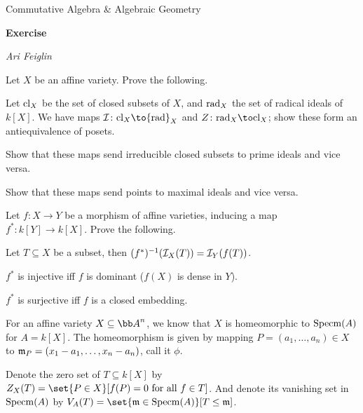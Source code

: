 


\def\enumindent{0cm}

\def\printmcount{\the\counter{section}.\the\counter{math counter}}
\setcounter{section}{7}

\centerline{Commutative Algebra \& Algebraic Geometry}
\medskip
\centerline{\bf Exercise \the{}}
\smallskip
\centerline{\it Ari Feiglin}

\def\rad{{\rm rad}}

\bprob

    \benum
        \item Let $X$ be an affine variety.
        Prove the following.
        \benum
            \item Let ${\rm cl}_X$ be the set of closed subsets of $X$, and $\rad_X$ the set of radical ideals of $k[X]$.
            We have maps $\I\colon\cll_X\to\rad_X$ and $Z\colon\rad_X\to\cll_X$; show these form an antiequivalence of posets.

            \item Show that these maps send irreducible closed subsets to prime ideals and vice versa.

            \item Show that these maps send points to maximal ideals and vice versa.
        \eenum

        \item Let $f\colon X\to Y$ be a morphism of affine varieties, inducing a map $f^*\colon k[Y]\to k[X]$.
        Prove the following.
        \benum
            \item Let $T\subseteq X$ be a subset, then $(f^*)^{-1}({{\cal I}}_X(T))={{\cal I}}_Y(f(T))$.
            \item $f^*$ is injective iff $f$ is {\emphcolor dominant} ($f(X)$ is dense in $Y$).
            \item $f^*$ is surjective iff $f$ is a closed embedding.
        \eenum
    \eenum

\eprob

\def\prime{{\rm prime}}

\benum
    \item For an affine variety $X\subseteq\bA^n$, we know that $X$ is homeomorphic to ${\rm Specm}(A)$ for $A=k[X]$.
    The homeomorphism is given by mapping $P=(a_1,\dots,a_n)\in X$ to ${{\frak m}}_P=(x_1-a_1,\dots,x_n-a_n)$, call it $\phi$.

    Denote the zero set of $T\subseteq k[X]$ by $Z_X(T)=\set{P\in X}[f(P)=0\hbox{ for all $f\in T$}]$.
    And denote its vanishing set in ${\rm Specm}(A)$ by $V_A(T)=\set{\m\in\specm(A)}[T\leq\m]$.

